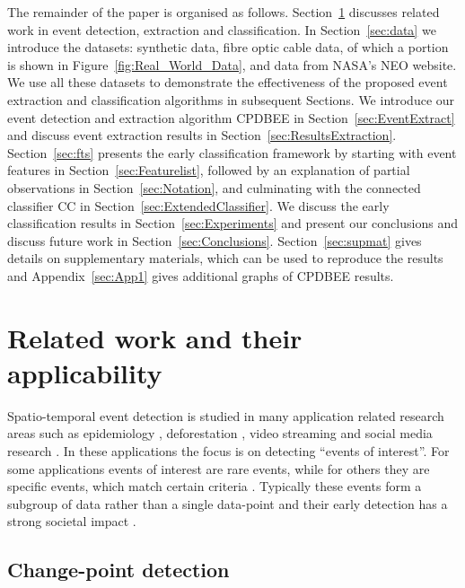 \documentclass[a4paper,11pt]{article}
\begin{document}
The remainder of the paper is organised as follows. Section~\ref{sec:RelatedWork} discusses related work in event detection, extraction and classification. In Section~\ref{sec:data} we introduce the datasets: synthetic data, fibre optic cable data, of which a portion is shown in Figure~\ref{fig:Real_World_Data}, and  data from NASA's NEO \citep{OMINO2} website. We use all these datasets to demonstrate the effectiveness of the proposed event extraction and classification algorithms in subsequent Sections. We introduce our event detection and extraction algorithm CPDBEE in Section~\ref{sec:EventExtract} and discuss event extraction results in Section~\ref{sec:ResultsExtraction}. Section~\ref{sec:fts} presents the early classification framework by starting with event features in Section~\ref{sec:Featurelist}, followed by an explanation of partial observations in Section~\ref{sec:Notation}, and culminating with the connected classifier CC in Section~\ref{sec:ExtendedClassifier}. We discuss the early classification results in Section~\ref{sec:Experiments} and present our conclusions and discuss future work in Section~\ref{sec:Conclusions}. Section~\ref{sec:supmat} gives details on supplementary materials, which can be used to reproduce the results and Appendix~\ref{sec:App1} gives additional graphs of CPDBEE results.

\section{Related work and their applicability}\label{sec:RelatedWork}

Spatio-temporal event detection is studied in many application related research areas such as epidemiology \citep{kulldorff1997spatial}, deforestation \citep{verbesselt2010phenological}, video streaming \citep{ke2007event} and social media research \citep{weng2011event}. In these applications the focus is on detecting ``events of interest''. For some applications events of interest are rare events, while for others they are specific events, which match certain criteria \citep{ke2007event}. Typically these events form a subgroup of data rather than a single data-point and their early detection has a strong societal impact \citep{earle2012twitter}.

\subsection{Change-point detection}\label{subsec:ChangePointDetection}
\end{document}
